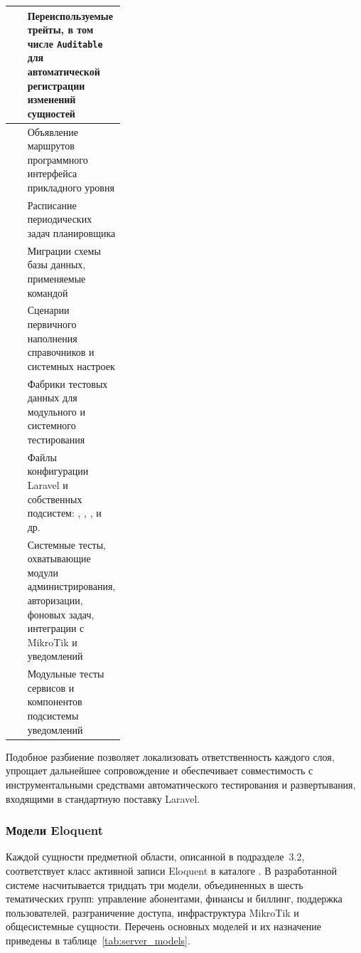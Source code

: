 \begin{xltabular}{\textwidth}{|>{\centering\arraybackslash}m{0.32\linewidth}|X|}
 & Переиспользуемые трейты, в том числе \texttt{Auditable} для автоматической регистрации изменений сущностей \\ \hline
{} & Объявление маршрутов программного интерфейса прикладного уровня \\ \hline
{} & Расписание периодических задач планировщика \\ \hline
{} & Миграции схемы базы данных, применяемые командой  \\ \hline
{} & Сценарии первичного наполнения справочников и системных настроек \\ \hline
{} & Фабрики тестовых данных для модульного и системного тестирования \\ \hline
{} & Файлы конфигурации Laravel и собственных подсистем: , , ,  и др. \\ \hline
{} & Системные тесты, охватывающие модули администрирования, авторизации, фоновых задач, интеграции с MikroTik и уведомлений \\ \hline
{} & Модульные тесты сервисов и компонентов подсистемы уведомлений \\ \hline
\end{xltabular}

Подобное разбиение позволяет локализовать ответственность каждого слоя, упрощает дальнейшее сопровождение и обеспечивает совместимость с инструментальными средствами автоматического тестирования и развертывания, входящими в стандартную поставку Laravel.

\subsubsection{Модели Eloquent}

Каждой сущности предметной области, описанной в подразделе~3.2, соответствует класс активной записи Eloquent в каталоге . В разработанной системе насчитывается тридцать три модели, объединенных в шесть тематических групп: управление абонентами, финансы и биллинг, поддержка пользователей, разграничение доступа, инфраструктура MikroTik и общесистемные сущности. Перечень основных моделей и их назначение приведены в таблице~\ref{tab:server_models}.

